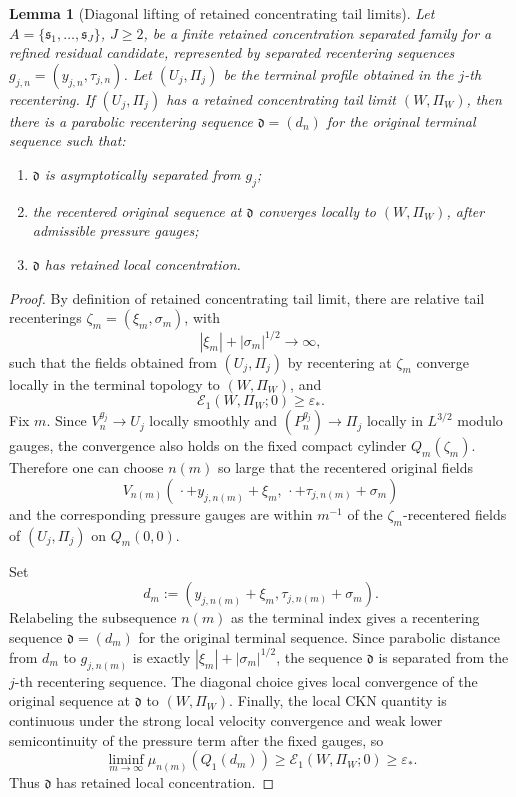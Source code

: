 \documentclass[11pt]{amsart}
\numberwithin{equation}{section}
\theoremstyle{plain}
\newtheorem{lemma}[theorem]{Lemma}
\theoremstyle{definition}
\theoremstyle{remark}
\newcommand{\eps}{\varepsilon}
\newcommand{\calE}{\mathcal E}
\begin{document}
\begin{lemma}[Diagonal lifting of retained concentrating tail limits]
\label{lem:diagonal-lifting-descendants}
Let \(A=\{\mathfrak s_1,\dots,\mathfrak s_J\}\), \(J\ge2\), be a finite
retained concentration separated family for a refined residual candidate, represented by
separated recentering sequences \(g_{j,n}=(y_{j,n},\tau_{j,n})\).  Let
\((U_j,\Pi_j)\) be the terminal profile obtained in the \(j\)-th recentering.  If
\((U_j,\Pi_j)\) has a retained concentrating tail limit \((W,\Pi_W)\), then
there is a parabolic recentering sequence \(\mathfrak d=(d_n)\) for the original terminal
sequence such that:
\begin{enumerate}[label=(\roman*)]
   \item \(\mathfrak d\) is asymptotically separated from \(g_j\);
   \item the recentered original sequence at \(\mathfrak d\) converges locally
   to \((W,\Pi_W)\), after admissible pressure gauges;
   \item \(\mathfrak d\) has retained local concentration.
\end{enumerate}
\end{lemma}

\begin{proof}
By definition of retained concentrating tail limit, there are relative tail
recenterings \(\zeta_m=(\xi_m,\sigma_m)\), with
\[
   |\xi_m|+|\sigma_m|^{1/2}\to\infty,
\]
such that the fields obtained from \((U_j,\Pi_j)\) by recentering at
\(\zeta_m\) converge locally in the terminal topology to \((W,\Pi_W)\), and
\[
   \calE_1(W,\Pi_W;0)\ge\eps_* .
\]
Fix \(m\).  Since \(V_n^{g_j}\to U_j\) locally smoothly and
\((P_n^{g_j})\to\Pi_j\) locally in \(L^{3/2}\) modulo gauges, the convergence
also holds on the fixed compact cylinder \(Q_m(\zeta_m)\).  Therefore one can
choose \(n(m)\) so large that the recentered original fields
\[
   V_{n(m)}(\,\cdot+y_{j,n(m)}+\xi_m,\,
             \cdot+\tau_{j,n(m)}+\sigma_m)
\]
and the corresponding pressure gauges are within \(m^{-1}\) of the
\(\zeta_m\)-recentered fields of \((U_j,\Pi_j)\) on \(Q_m(0,0)\).

Set
\[
   d_m:=(y_{j,n(m)}+\xi_m,\tau_{j,n(m)}+\sigma_m).
\]
Relabeling the subsequence \(n(m)\) as the terminal index gives a recentering sequence
\(\mathfrak d=(d_m)\) for the original terminal sequence.  Since
parabolic distance from \(d_m\) to \(g_{j,n(m)}\) is exactly
\(|\xi_m|+|\sigma_m|^{1/2}\), the sequence \(\mathfrak d\) is separated from
the \(j\)-th recentering sequence.  The diagonal choice gives local convergence of the
original sequence at \(\mathfrak d\) to \((W,\Pi_W)\).  Finally, the local
CKN quantity is continuous under the strong local velocity convergence and
weak lower semicontinuity of the pressure term after the fixed gauges, so
\[
   \liminf_{m\to\infty}\mu_{n(m)}(Q_1(d_m))
   \ge \calE_1(W,\Pi_W;0)\ge\eps_* .
\]
Thus \(\mathfrak d\) has retained local concentration.
\end{proof}
\end{document}
